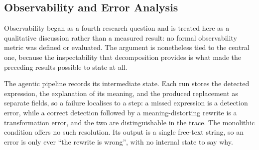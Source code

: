 \subsection{Observability and Error Analysis}
\label{sec:discussion-observability}


Observability began as a fourth research question and is treated here as a qualitative discussion rather than a measured result: no formal observability metric was defined or evaluated. The argument is nonetheless tied to the central one, because the inspectability that decomposition provides is what made the preceding results possible to state at all.

The agentic pipeline records its intermediate state. Each run stores the detected expression, the explanation of its meaning, and the produced replacement as separate fields, so a failure localises to a step: a missed expression is a detection error, while a correct detection followed by a meaning-distorting rewrite is a transformation error, and the two are distinguishable in the trace. The monolithic condition offers no such resolution. Its output is a single free-text string, so an error is only ever ``the rewrite is wrong'', with no internal state to say why.


